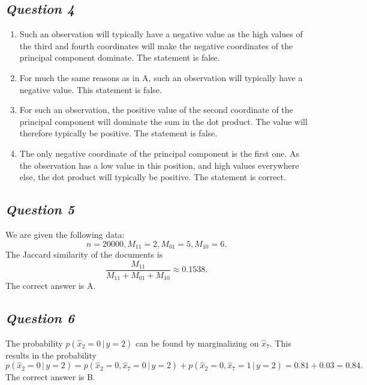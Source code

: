 \documentclass[twoside,11pt]{article}
\makeatletter
\let\@oldsubsection\subsection
\renewcommand\subsection[1]{\@oldsubsection*{\textit{#1}}}
\makeatother
\begin{document}
\subsection{Question 4}

\begin{enumerate}[label=\Alph*.]
	\item Such an observation will typically have a negative value as the high values of the third and fourth coordinates will make the negative coordinates of the principal component dominate. The statement is false.

	\item For much the same reasons as in A, such an observation will typically have a negative value. This statement is false.

	\item For such an observation, the positive value of the second coordinate of the principal component will dominate the sum in the dot product. The value will therefore typically be positive. The statement is false.

	\item The only negative coordinate of the principal component is the first one. As the observation has a low value in this position, and high values everywhere else, the dot product will typically be positive. The statement is correct.
	\end{enumerate}

\subsection{Question 5}

We are given the following data:
\[
	n = 20000, M_{11} = 2, M_{01} = 5, M_{10} = 6.
\]
The Jaccard similarity of the documents is
\[
	\frac{M_{11}}{M_{11} + M_{01} + M_{10}} \approx 0.1538.
\]
The correct answer is A.

\subsection{Question 6}

The probability \(p(\hat{x}_2 = 0 \, | \, y = 2)\) can be found by marginalizing on \(\hat{x}_7\). This results in the probability
\[
	p(\hat{x}_2 = 0 \, | \, y = 2) = p(\hat{x}_2 = 0, \hat{x}_7 = 0 \, | \, y = 2)
	+ p(\hat{x}_2 = 0, \hat{x}_7 = 1 \, | \, y = 2) = 0.81 + 0.03 = 0.84.
\]
The correct answer is B.
\end{document}
